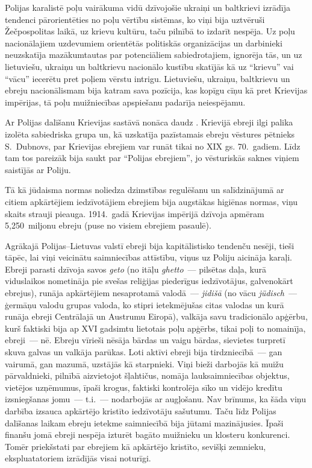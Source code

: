 \documentclass[twoside,a5paper,12pt,fleqn,openany]{extbook}
\newcommand{\detxti}[1]{\textit{\textgerman{#1}}}
\newcommand{\ittxti}[1]{\textit{\textitalian{#1}}}
\begin{document}
Polijas karalistē poļu vairākuma vidū dzīvojošie ukraiņi un baltkrievi izrādīja tendenci pārorientēties no poļu vērtību sistēmas, ko viņi bija uztvēruši Žečpospolitas laikā, uz krievu kultūru, taču pilnībā to izdarīt nespēja. Uz poļu nacionālajiem uzdevumiem orientētās politiskās organizācijas un darbinieki neuzskatīja mazākumtautas par potenciāliem sabiedrotajiem, ignorēja tās, un uz lietuviešu, ukraiņu un baltkrievu nacionālo kustību skatījās kā uz ``krievu'' vai ``vācu'' iecerētu pret poļiem vērstu intrigu. Lietuviešu, ukraiņu, baltkrievu un ebreju nacionālismam bija katram sava pozīcija, kas kopīgu cīņu kā pret Krievijas impērijas, tā poļu muižniecības apspiešanu padarīja neiespējamu.

Ar Polijas dalīšanu Krievijas sastāvā nonāca daudz . Krievijā ebreji ilgi palika izolēta sabiedriska grupa un, kā uzskatīja pazīstamais ebreju vēstures pētnieks S.~Dubnovs, par Krievijas ebrejiem var runāt tikai no XIX gs. 70.~gadiem. Līdz tam tos pareizāk bija saukt par ``Polijas ebrejiem'', jo vēsturiskās saknes viņiem saistījās ar Poliju.

Tā kā jūdaisma normas noliedza dzimstības regulēšanu un salīdzinājumā ar citiem apkārtējiem iedzīvotājiem ebrejiem bija augstākas higiēnas normas, viņu skaits strauji pieauga. 1914.~gadā Krievijas impērijā dzīvoja apmēram 5,250~miljonu ebreju (puse no visiem ebrejiem pasaulē).

Agrākajā Polijas--Lietuvas valstī ebreji bija kapitālistisko tendenču nesēji, tieši tāpēc, lai viņi veicinātu saimniecības attīstību, viņus uz Poliju aicināja karaļi. Ebreji parasti dzīvoja savos \emph{geto} (no itāļu \ittxti{ghetto}~--- pilsētas daļa, kurā viduslaikos nometināja pie svešas reliģijas piederīgus iedzīvotājus, galvenokārt ebrejus), runāja apkārtējiem nesaprotamā valodā~--- \emph{jidišā} (no vācu \detxti{jüdisch}~--- ģermāņu valodu grupas valoda, ko stipri ietekmējušas citas valodas un kurā runāja ebreji Centrālajā un Austrumu Eiropā), valkāja savu tradicionālo apģērbu, kurš faktiski bija ap XVI gadsimtu lietotais poļu apģērbs, tikai poļi to nomainīja, ebreji~--- nē. Ebreju vīrieši nēsāja bārdas un vaigu bārdas, sievietes turpretī skuva galvas un valkāja parūkas. Loti aktīvi ebreji bija tirdzniecībā~--- gan vairumā, gan mazumā, uzstājās kā starpnieki. Viņi bieži darbojās kā muižu pārvaldnieki, pilnībā aizvietojot šļahtičus, nomāja lauksaimniecības objektus, vietējos uzņēmumus, īpaši krogus, faktiski kontrolēja sīko un vidējo kredītu izsniegšanas jomu~--- t.i.~--- nodarbojās ar augļošanu. Nav brīnums, ka šāda viņu darbība izsauca apkārtējo kristīto iedzīvotāju sašutumu. Taču līdz Polijas dalīšanas laikam ebreju ietekme saimniecībā bija jūtami mazinājusies. Īpaši finanšu jomā ebreji nespēja izturēt bagāto muižnieku un klosteru konkurenci. Tomēr priekšstati par ebrejiem kā apkārtējo kristīto, sevišķi zemnieku, ekspluatatoriem izrādījās visai noturīgi.
\end{document}
